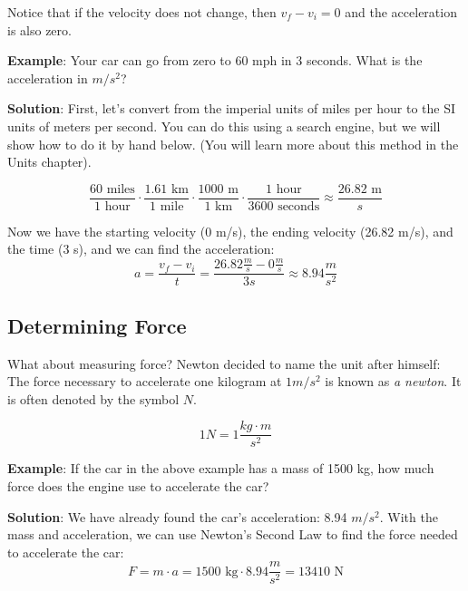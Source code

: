 Notice that if the velocity does not change, then $v_f - v_i = 0$ and the 
acceleration is also zero.

\textbf{Example}: Your car can go from zero to 60 mph in 3 seconds. What is the
acceleration in $m / s^2$?

\textbf{Solution}: First, let's convert from the imperial units of miles per
hour to the SI units of meters per second. You can do this using a search engine, 
but we will show how to do it by hand below. (You will learn more about this 
method in the Units chapter).

$$\frac{60 \text{ miles}}{1 \text{ hour}} \cdot \frac{1.61 \text{ km}}{1 
\text{ mile}} \cdot \frac{1000\text{ m}}{1\text{ km}} \cdot \frac{1\text{ hour}}{
3600\text{ seconds}} \approx \frac{26.82\text{ m}}{s}$$

Now we have the starting velocity (0 m/s), the ending velocity (26.82 m/s), and 
the time (3 s), and we can find the acceleration:
$$a = \frac{v_f - v_i}{t} = \frac{26.82\frac{m}{s} - 0\frac{m}{s}}{3s} \approx 
8.94 \frac{m}{s^2}$$

\subsection{Determining Force}
What about measuring force? Newton decided to name the unit after himself: The
force necessary to accelerate one kilogram at $1 m/s^2$ is known as \textit{a
newton}. It is often denoted by the symbol $N$.

$$1 N = 1 \frac{kg \cdot m}{s^2}$$

\textbf{Example}: If the car in the above example has a mass of 1500 kg, how much 
force does the engine use to accelerate the car?

\textbf{Solution}: We have already found the car's acceleration: 8.94 $m/s^2$. 
With the mass and acceleration, we can use Newton's Second Law to find the force 
needed to accelerate the car:
$$F = m \cdot a = 1500\text{ kg} \cdot 8.94 \frac{m}{s^2} = 13410\text{ N}$$

